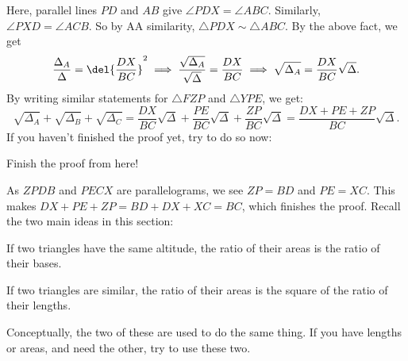 \documentclass[11pt,paper=letter]{scrartcl}
\begin{document}
Here, parallel lines $PD$ and $AB$ give $\angle PDX = \angle ABC$. Similarly, $\angle PXD = \angle ACB$. So by AA similarity, $\triangle PDX \sim \triangle ABC$. By the above fact, we get $$\frac{\Delta_A}{\Delta} = \del{\frac{DX}{BC}}^2 \implies \frac{\sqrt{\Delta_A}}{\sqrt{\Delta}} = \frac{DX}{BC} \implies \sqrt{\Delta_A} = \frac{DX}{BC}\sqrt{\Delta}.$$
By writing similar statements for $\triangle FZP$ and $\triangle YPE$, we get:
$$\sqrt{\Delta_A} + \sqrt{\Delta_B} + \sqrt{\Delta_C} = \frac{DX}{BC} \sqrt{\Delta} + \frac{PE}{BC} \sqrt{\Delta} + \frac{ZP}{BC} \sqrt{\Delta} = \frac{DX + PE + ZP}{BC} \sqrt{\Delta}.$$ If you haven't finished the proof yet, try to do so now:
\begin{exboxed}
  Finish the proof from here!
\end{exboxed}
As $ZPDB$ and $PECX$ are parallelograms, we see $ZP = BD$ and $PE = XC$. This makes $DX + PE + ZP = BD + DX + XC = BC$, which finishes the proof. 
\newpage
Recall the two main ideas in this section:
\begin{enumthin}
  \item If two triangles have the same altitude, the ratio of their areas is the ratio of their bases.
  \item If two triangles are similar, the ratio of their areas is the square of the ratio of their lengths.
\end{enumthin}
Conceptually, the two of these are used to do the same thing.  If you have lengths or areas, and need the other, try to use these two.
\end{document}
